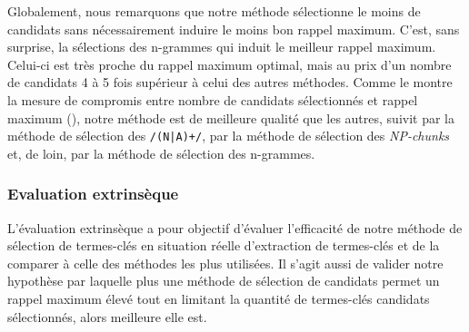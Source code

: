         Globalement, nous remarquons que notre méthode sélectionne le moins de
        candidats sans nécessairement induire le moins bon rappel maximum.
        C'est, sans surprise, la sélections des n-grammes qui induit le meilleur
        rappel maximum. Celui-ci est très proche du rappel maximum optimal, mais
        au prix d'un nombre de candidats 4 à 5 fois supérieur à celui des autres
        méthodes. Comme le montre la mesure de compromis entre nombre de
        candidats sélectionnés et rappel maximum (), notre méthode
        est de meilleure qualité que les autres, suivit par la méthode de
        sélection des \texttt{/(N|A)+/}, par la méthode de sélection des
        \textit{NP-chunks} et, de loin, par la méthode de sélection des
        n-grammes.

      \subsubsection{Evaluation extrinsèque}
      \label{subsubsec:main-automatic_keyphrase_annotation-keyphrase_candidate_selection-evaluation-extrinsic_evaluation}
        L'évaluation extrinsèque a pour objectif d'évaluer l'efficacité de notre
        méthode de sélection de termes-clés en situation réelle d'extraction de
        termes-clés et de la comparer à celle des méthodes les plus utilisées.
        Il s'agit aussi de valider notre hypothèse par laquelle plus une méthode
        de sélection de candidats permet un rappel maximum élevé tout en
        limitant la quantité de termes-clés candidats sélectionnés, alors
        meilleure elle est.

